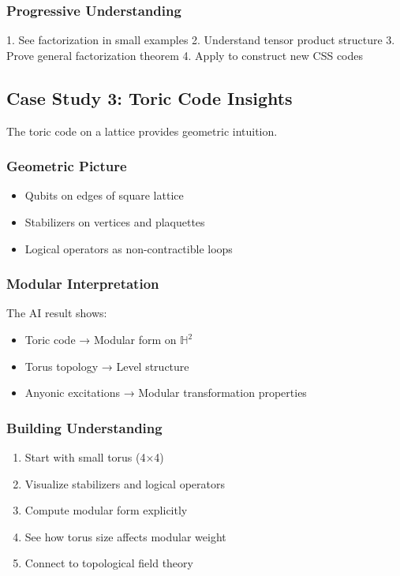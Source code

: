\documentclass[11pt,a4paper]{article}
\newcommand{\HH}{\mathbb{H}}
\begin{document}
\subsubsection{Progressive Understanding}
1. See factorization in small examples
2. Understand tensor product structure
3. Prove general factorization theorem
4. Apply to construct new CSS codes

\subsection{Case Study 3: Toric Code Insights}

The toric code on a lattice provides geometric intuition.

\subsubsection{Geometric Picture}
\begin{itemize}
\item Qubits on edges of square lattice
\item Stabilizers on vertices and plaquettes
\item Logical operators as non-contractible loops
\end{itemize}

\subsubsection{Modular Interpretation}
The AI result shows:
\begin{itemize}
\item Toric code → Modular form on $\HH^2$ 
\item Torus topology → Level structure
\item Anyonic excitations → Modular transformation properties
\end{itemize}

\subsubsection{Building Understanding}
\begin{enumerate}
\item Start with small torus (4×4)
\item Visualize stabilizers and logical operators
\item Compute modular form explicitly
\item See how torus size affects modular weight
\item Connect to topological field theory
\end{enumerate}
\end{document}
